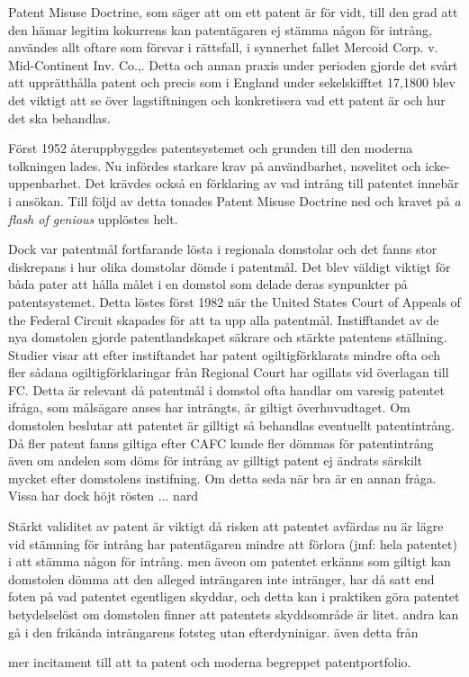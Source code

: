 Patent Misuse Doctrine, som säger att om ett patent är för vidt, till den grad att den hämar legitim
kokurrens kan patentägaren ej stämma någon för intrång, användes allt oftare som försvar i rättsfall, i
synnerhet fallet Mercoid Corp. v. Mid-Continent Inv. Co.,\cite{nard}. Detta och annan praxis under perioden gjorde det svårt att upprätthålla patent
och precis som i England under sekelskifftet 17,1800 blev det viktigt att se över lagstiftningen och
konkretisera vad ett patent är och hur det ska behandlas.

Först 1952 återuppbyggdes patentsystemet och grunden till den moderna tolkningen lades. Nu infördes
starkare krav på användbarhet, novelitet och icke-uppenbarhet. Det krävdes också en förklaring av vad
intrång till patentet innebär i ansökan. Till följd av detta tonades Patent Misuse Doctrine ned och kravet
på \emph{a flash of genious} upplöstes helt\cite{nard}.

Dock var patentmål fortfarande lösta i regionala domstolar och det fanns stor diskrepans i hur olika
domstolar dömde i patentmål\cite{nard}. Det blev väldigt viktigt för båda pater att hålla målet i en domstol som
delade deras synpunkter på patentsystemet. Detta löstes först 1982 när the United States Court of Appeals
of the Federal Circuit skapades för att ta upp alla patentmål\cite{nard}. Instifftandet av de nya domstolen
gjorde patentlandskapet säkrare och stärkte patentens ställning. Studier visar att efter instiftandet har
patent ogiltigförklarats mindre ofta och fler sådana ogiltigförklaringar från Regional Court har ogillats
vid överlagan till FC. \cite{henry} Detta är relevant då patentmål i domstol ofta handlar om varesig
patentet ifråga, som målsägare anses har inträngts, är giltigt överhuvudtaget. Om domstolen beslutar att
patentet är gilltigt så behandlas eventuellt patentintrång. Då fler patent fanns giltiga efter CAFC kunde
fler dömmas för patentintrång även om andelen som döms för intrång av gilltigt patent ej ändrats särskilt
mycket efter domstolens instifning. Om detta seda när bra är en annan fråga. Vissa har dock höjt rösten ... nard

Stärkt validitet av patent är viktigt då risken att patentet avfärdas nu är lägre vid stämning för intrång har patentägaren mindre att förlora (jmf: hela patentet) i att stämma någon för intrång. men äveon om patentet erkänns som giltigt kan domstolen dömma att den alleged inträngaren inte intränger, har då satt end foten på vad patentet egentligen skyddar, och detta kan i praktiken göra patentet betydelselöst om domstolen finner att patentets skyddsområde är litet. andra kan gå i den frikända inträngarens fotsteg utan efterdyninigar. även detta från \cite{henry}

 mer incitament till att ta patent och moderna begreppet patentportfolio.

